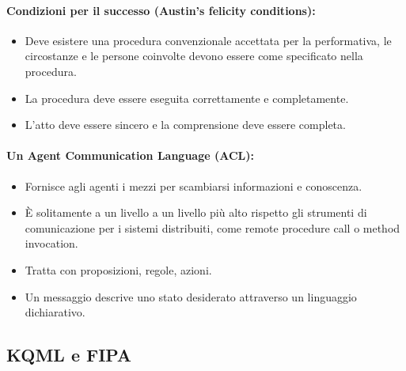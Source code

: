
\paragraph{Condizioni per il successo (Austin's felicity conditions):}

\begin{itemize}
  \item Deve esistere una procedura convenzionale accettata per la performativa, le circostanze e le persone coinvolte devono essere come specificato nella procedura. 
  \item La procedura deve essere eseguita correttamente e completamente. 
  \item L'atto deve essere sincero e la comprensione deve essere completa.
\end{itemize}

\paragraph{Un Agent Communication Language (ACL):}

\begin{itemize}
  \item Fornisce agli agenti i mezzi per scambiarsi informazioni e conoscenza. 
  \item È solitamente a un livello a un livello più alto rispetto gli strumenti di comunicazione per i sistemi distribuiti, come remote procedure call o method invocation. 
  \item Tratta con proposizioni, regole, azioni. 
  \item Un messaggio descrive uno stato desiderato attraverso un linguaggio dichiarativo. 
\end{itemize}

\subsection{KQML e FIPA}



